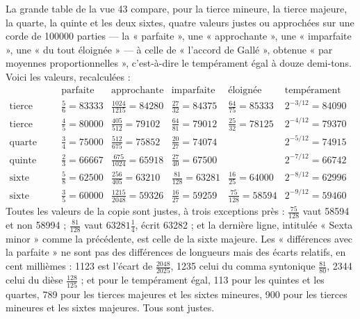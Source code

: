\documentclass[11pt,a4paper]{article}
\begin{document}
La grande table de la vue 43 compare, pour la tierce mineure, la tierce majeure,
la quarte, la quinte et les deux sixtes, quatre valeurs justes ou approchées sur
une corde de 100000 parties — la « parfaite », une « approchante », une
« imparfaite », une « du tout éloignée » — à celle de « l'accord de Gallé »,
obtenue « par moyennes proportionnelles », c'est-à-dire le tempérament égal à
douze demi-tons. Voici les valeurs, recalculées :
\[
\begin{array}{l|c|c|c|c|c}
 & \text{parfaite} & \text{approchante} & \text{imparfaite}
   & \text{éloignée} & \text{tempérament égal} \\ \hline
\text{tierce mineure} & \frac56 = 83333 & \frac{1024}{1215} = 84280
   & \frac{27}{32} = 84375 & \frac{64}{75} = 85333 & 2^{-3/12} = 84090 \\
\text{tierce majeure} & \frac45 = 80000 & \frac{405}{512} = 79102
   & \frac{64}{81} = 79012 & \frac{25}{32} = 78125 & 2^{-4/12} = 79370 \\
\text{quarte} & \frac34 = 75000 & \frac{512}{675} = 75852
   & \frac{20}{27} = 74074 & & 2^{-5/12} = 74915 \\
\text{quinte} & \frac23 = 66667 & \frac{675}{1024} = 65918
   & \frac{27}{40} = 67500 & & 2^{-7/12} = 66742 \\
\text{sixte mineure} & \frac58 = 62500 & \frac{256}{405} = 63210
   & \frac{81}{128} = 63281 & \frac{16}{25} = 64000 & 2^{-8/12} = 62996 \\
\text{sixte majeure} & \frac35 = 60000 & \frac{1215}{2048} = 59326
   & \frac{16}{27} = 59259 & \frac{75}{128} = 58594 & 2^{-9/12} = 59460
\end{array}
\]
Toutes les valeurs de la copie sont justes, à trois exceptions près :
$\frac{75}{128}$ vaut 58594 et non 58994 ; $\frac{81}{128}$ vaut $63281\frac14$,
écrit 63282 ; et la dernière ligne, intitulée « Sexta minor » comme la
précédente, est celle de la sixte majeure. Les « différences avec la parfaite »
ne sont pas des différences de longueurs mais des écarts relatifs, en cent
millièmes : 1123 est l'écart de $\frac{2048}{2025}$, 1235 celui du comma
syntonique $\frac{81}{80}$, 2344 celui du dièse $\frac{128}{125}$ ; et pour le
tempérament égal, 113 pour les quintes et les quartes, 789 pour les tierces
majeures et les sixtes mineures, 900 pour les tierces mineures et les sixtes
majeures. Tous sont justes.
\end{document}
